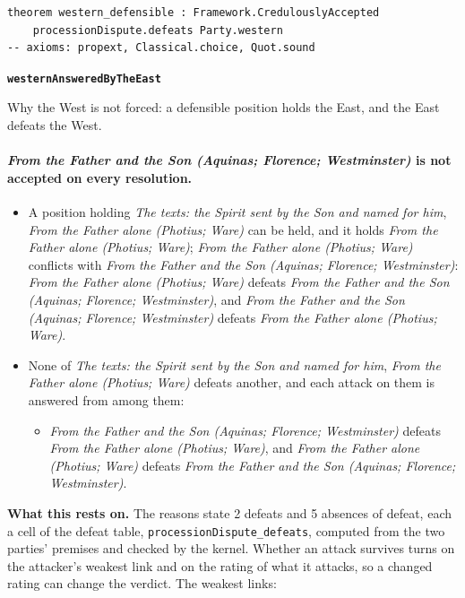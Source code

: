 \documentclass[11pt,paper=\testimonypaper,DIV=13,parskip=false]{scrartcl}
\begin{document}
{\small\begin{verbatim}
theorem western_defensible : Framework.CredulouslyAccepted
    processionDispute.defeats Party.western
-- axioms: propext, Classical.choice, Quot.sound
\end{verbatim}}
\par\medskip\noindent\textbf{\texttt{western\allowbreak{}Answered\allowbreak{}By\allowbreak{}The\allowbreak{}East}}\par\nobreak\noindent
Why the West is not forced: a defensible position holds the East, and the East defeats the West.

\paragraph{\emph{From the Father and the Son (Aquinas; Florence; Westminster)} is not accepted on every resolution.}
\begin{itemize}
\item A position holding \emph{The texts: the Spirit sent by the Son and named for him}, \emph{From the Father alone (Photius; Ware)} can be held, and it holds \emph{From the Father alone (Photius; Ware)}; \emph{From the Father alone (Photius; Ware)} conflicts with \emph{From the Father and the Son (Aquinas; Florence; Westminster)}: \emph{From the Father alone (Photius; Ware)} defeats \emph{From the Father and the Son (Aquinas; Florence; Westminster)}, and \emph{From the Father and the Son (Aquinas; Florence; Westminster)} defeats \emph{From the Father alone (Photius; Ware)}.
\item None of \emph{The texts: the Spirit sent by the Son and named for him}, \emph{From the Father alone (Photius; Ware)} defeats another, and each attack on them is answered from among them:
\begin{itemize}
\item \emph{From the Father and the Son (Aquinas; Florence; Westminster)} defeats \emph{From the Father alone (Photius; Ware)}, and \emph{From the Father alone (Photius; Ware)} defeats \emph{From the Father and the Son (Aquinas; Florence; Westminster)}.
\end{itemize}
\end{itemize}
\par\noindent\textbf{What this rests on.} The reasons state 2 defeats and 5 absences of defeat, each a cell of the defeat table, \texttt{procession\allowbreak{}Dispute\_\allowbreak{}defeats}, computed from the two parties' premises and checked by the kernel. Whether an attack survives turns on the attacker's weakest link and on the rating of what it attacks, so a changed rating can change the verdict. The weakest links:
\end{document}
